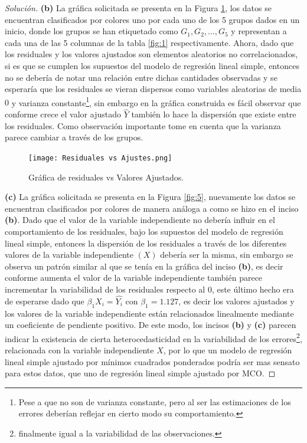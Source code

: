 \documentclass[10.5pt,notitlepage]{article}
\newenvironment{solucion}
  {\begin{proof}[Solución]}
  {\end{proof}}
\theoremstyle{plain}
\begin{document}
\begin{solucion}
\noindent \textbf{(b)} La gráfica solicitada se presenta en la Figura \ref{fig:4}, los datos se encuentran clasificados por colores uno por cada uno de los 5 grupos dados en un inicio, donde los grupos se han etiquetado como \(G_1,G_2,\hdots,G_5\) y representan a cada una de las 5 columnas de la tabla \ref{fig:1} respectivamente. Ahora, dado que los residuales y los valores ajustados son elementos aleatorios no correlacionados, si es que se cumplen los supuestos del modelo de regresión lineal simple, entonces no se debería de notar una relación entre dichas cantidades observadas y se esperaría que los residuales se vieran dispersos como variables aleatorias de media \(0\) y varianza constante\footnote{Pese a que no son de varianza constante, pero al ser las estimaciones de los errores deberían reflejar en cierto modo su comportamiento.}, sin embargo en la gráfica construida es fácil observar que conforme crece el valor ajustado \(\hat{Y}\) también lo hace la dispersión que existe entre los residuales. Como observación importante tome en cuenta que la varianza parece cambiar a través de los grupos.\\
\begin{figure}[htb]
 \centering
 \texttt{[image: Residuales vs Ajustes.png]}
 \caption{Gráfica de residuales vs Valores Ajustados.}
 \label{fig:4}
\end{figure}

\noindent \textbf{(c)} La gráfica solicitada se presenta en la Figura \ref{fig:5}, nuevamente los datos se encuentran clasificados por colores de manera análoga a como se hizo en el inciso \textbf{(b)}. Dado que el valor de la variable independiente no debería influir en el comportamiento de los residuales, bajo los supuestos del modelo de regresión lineal simple, entonces la dispersión de los residuales a través de los diferentes valores de la variable independiente \((X)\) debería ser la misma, sin embargo se observa un patrón similar al que se tenía en la gráfica del inciso \textbf{(b)}, es decir conforme aumenta el valor de la variable independiente también parece incrementar la variabilidad de los residuales respecto al \(0\), este último hecho era de esperarse dado que \(\beta_1 X_i = \hat{Y_i}\) con \(\beta_1 = 1.127\), es decir los valores ajustados y los valores de la variable independiente están relacionados linealmente mediante un coeficiente de pendiente positivo. De este modo, los incisos \textbf{(b)} y \textbf{(c)} parecen indicar la existencia de cierta heterocedasticidad en la variabilidad de los errores\footnote{finalmente igual a la variabilidad de las observaciones.}, relacionada con la variable independiente \(X\), por lo que un modelo de regresión lineal simple ajustado por mínimos cuadrados ponderados podría ser mas sensato para estos datos, que uno de regresión lineal simple ajustado por MCO.


\end{solucion}
\end{document}
